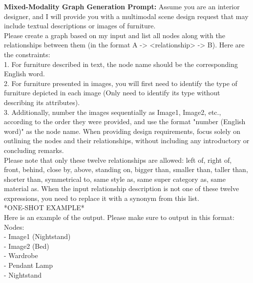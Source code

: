 \begin{figure*}[!t]
    \centering
    \begin{center}
    \begin{tcolorbox} [top=2pt,bottom=2pt, width=\linewidth, boxrule=1pt]
    {\footnotesize {\selectfont
    \textbf{Mixed-Modality Graph Generation Prompt:}
  Assume you are an interior designer, and I will provide you with a multimodal scene design request that may include textual descriptions or images of furniture. \\
  Please create a graph based on my input and list all nodes along with the relationships between them (in the format A -> <relationship> -> B). Here are the constraints: \\
  1. For furniture described in text, the node name should be the corresponding English word. \\
  2. For furniture presented in images, you will first need to identify the type of furniture depicted in each image (Only need to identify its type without describing its attributes).  \\
  3. Additionally, number the images sequentially as Image1, Image2, etc., according to the order they were provided, and use the format "number (English word)" as the node name. When providing design requirements, focus solely on outlining the nodes and their relationships, without including any introductory or concluding remarks.\\
  
  Please note that only these twelve relationships are allowed: left of, right of, front, behind, close by, above, standing on, bigger than, smaller than, taller than, shorter than, symmetrical to, same style as, same super category as, same material as. When the input relationship description is not one of these twelve expressions, you need to replace it with a synonym from this list. \\
  
    *ONE-SHOT EXAMPLE* \\
    
    Here is an example of the output. Please make sure to output in this format: \\
    
    Nodes: \\
    - Image1 (Nightstand) \\
    - Image2 (Bed)   \\
    - Wardrobe   \\
    - Pendant Lamp  \\
    - Nightstand   \\
    
}}
\end{tcolorbox}
\end{center}
\end{figure*}
